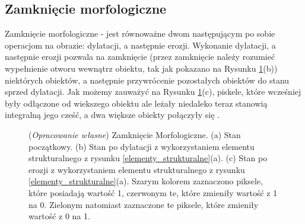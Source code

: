 \documentclass{article}
\begin{document}
        \subsection{Zamknięcie morfologiczne}
        {
            \label{sec:zamkniecie-morfologiczne}
            \Large
            \justifying
            \quad
            Zamknięcie morfologiczne - jest równoważne dwom następującym po sobie operacjom na obrazie: dylatacji, a następnie erozji.
            Wykonanie dylatacji, a następnie erozji pozwala na zamknięcie (przez zamknięcie należy rozumieć wypełnienie otworu wewnątrz obiektu, tak jak pokazano na Rysunku \ref{Zamkniecie_morfologiczne}(b)) niektórych obiektów, a następnie przywrócenie pozostałych obiektów do stanu sprzed dylatacji.
            Jak możemy zauważyć na Rysunku \ref{Zamkniecie_morfologiczne}(c), piskele, które wcześniej były odłączone od wiekszego obiektu ale leżały niedaleko teraz stanowią integralną jego cześć, a dwa większe obiekty połączyły się \cite{Digital Image Processing Second Edition}.
        }

        \begin{figure}[H]
            \centering
            \qquad
            \qquad
            \caption
            {
                (\textit{Opracowanie własne}) Zamknięcie Morfologiczne.
                (a) Stan początkowy.
                (b) Stan po dylatacji z wykorzystaniem elementu strukturalnego z rysunku \ref{elementy_strukturalne}(a).
                (c) Stan po erozji z wykorzystaniem elementu strukturalnego z rysunku \ref{elementy_strukturalne}(a).
                Szarym kolorem zaznaczono piksele, które posiadają wartość 1, czerwonym te, które zmieniły wartość z 1 na 0. Zielonym natomiast zaznaczone te piksele, które zmieniły wartość z 0 na 1.
            }
            \label{Zamkniecie_morfologiczne}
        \end{figure}
\end{document}
